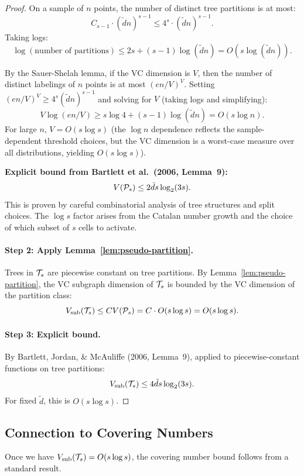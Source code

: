 \documentclass[12pt]{article}
\begin{document}
\begin{proof}
On a sample of $n$ points, the number of distinct tree partitions is at most:
\[
C_{s-1} \cdot (\tilde{d} n)^{s-1} \le 4^s \cdot (\tilde{d} n)^{s-1}.
\]
Taking logs:
\[
\log(\text{number of partitions}) \le 2s + (s-1) \log(\tilde{d} n) = O(s \log(\tilde{d} n)).
\]

By the Sauer-Shelah lemma, if the VC dimension is $V$, then the number of distinct labelings of $n$ points is at most $(en/V)^V$. Setting $(en/V)^V \ge 4^s (\tilde{d} n)^{s-1}$ and solving for $V$ (taking logs and simplifying):
\[
V \log(en/V) \ge s \log 4 + (s-1) \log(\tilde{d} n) = O(s \log n).
\]
For large $n$, $V = O(s \log s)$ (the $\log n$ dependence reflects the sample-dependent threshold choices, but the VC dimension is a worst-case measure over all distributions, yielding $O(s \log s)$).

\textbf{Explicit bound from Bartlett et al.\ (2006, Lemma~9):}
\[
V(\mathcal{P}_s) \le 2\tilde{d} s \log_2(3s).
\]
This is proven by careful combinatorial analysis of tree structures and split choices. The $\log s$ factor arises from the Catalan number growth and the choice of which subset of $s$ cells to activate.

\paragraph{Step 2: Apply Lemma~\ref{lem:pseudo-partition}.}
Trees in $\mathcal{T}_s$ are piecewise constant on tree partitions. By Lemma~\ref{lem:pseudo-partition}, the VC subgraph dimension of $\mathcal{T}_s$ is bounded by the VC dimension of the partition class:
\[
V_{\text{sub}}(\mathcal{T}_s) \le C V(\mathcal{P}_s) = C \cdot O(s \log s) = O(s \log s).
\]

\paragraph{Step 3: Explicit bound.}
By Bartlett, Jordan, \& McAuliffe (2006, Lemma~9), applied to piecewise-constant functions on tree partitions:
\[
V_{\text{sub}}(\mathcal{T}_s) \le 4\tilde{d} s \log_2(3s).
\]
For fixed $\tilde{d}$, this is $O(s \log s)$.
\end{proof}

\subsection{Connection to Covering Numbers}

Once we have $V_{\text{sub}}(\mathcal{T}_s) = O(s \log s)$, the covering number bound follows from a standard result.
\end{document}
